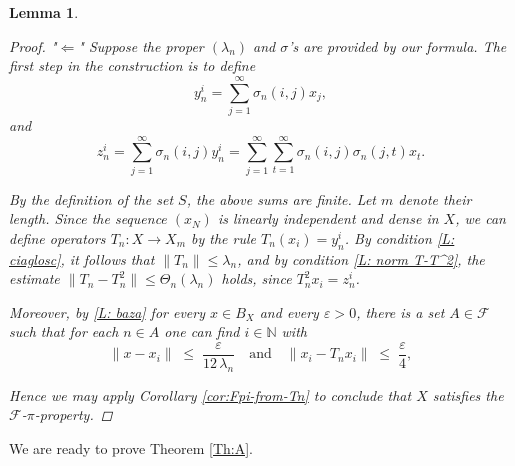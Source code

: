 \documentclass[12pt,fleqn]{amsart}
\newcommand{\FF}{\mathscr{F}}
\renewcommand{\leq}{\leqslant}
\newtheorem{lemma}[theorem]{Lemma}
\theoremstyle{definition}
\theoremstyle{remark}
\begin{document}
\begin{lemma}
\begin{proof}
"\(\Leftarrow\)" Suppose the proper \((\lambda_n)\) and \(\sigma\)'s are provided by our formula. The first step in the construction is to define  
\begin{equation}
    y_{n}^i = \sum_{j=1}^\infty \sigma_{n}(i, j) x_j,
\end{equation}
and  
\begin{equation}
    z_{n}^i = \sum_{j=1}^\infty \sigma_{n}(i, j) y^i_{n} = \sum_{j=1}^\infty \sum_{t=1}^\infty \sigma_{n}(i, j) \sigma_{n}(j, t) x_t.
\end{equation}

By the definition of the set \(S\), the above sums are finite. Let \(m\) denote their length. Since the sequence \((x_N)\) is linearly independent and dense in \(X\), we can define operators \(T_n \colon X \to X_m\) by the rule \(T_n(x_i) = y_{n}^i\). By condition \eqref{L: ciaglosc}, it follows that \(\|T_n\| \leq \lambda_n\), and by condition \eqref{L: norm T-T^2}, the estimate \(\|T_n - T_n^2\| \leq \Theta_n(\lambda_n)\) holds, since \(T_n^2x_i=z^i_n\). 

Moreover, by \eqref{L: baza} for every $x \in B_X$ and every $\varepsilon>0$, there is a set $A \in \FF$ such that for each $n\in A$ one can find $i\in \mathbb{N}$ with
    \begin{equation}\label{eq:approx-dense-2}
        \|x - x_i\|\;\leqslant\; \frac{\varepsilon}{12\,\lambda_n}
        \quad\text{and}\quad
        \|x_i - T_n x_i\|\;\leqslant\;\frac{\varepsilon}{4},
    \end{equation}    

Hence we may apply Corollary \ref{cor:Fpi-from-Tn} to conclude that $X$ satisfies the $\FF$-$\pi$-property. 
\end{proof}
\end{lemma}
We are ready to prove Theorem \ref{Th:A}.
\end{document}
